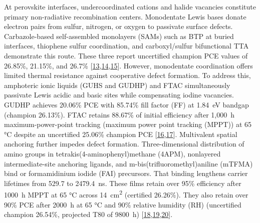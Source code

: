 \documentclass[
  11pt,
]{article}
\begin{document}
At perovskite interfaces, undercoordinated  cations and halide
vacancies constitute primary non-radiative recombination centers.
Monodentate Lewis bases donate electron pairs from sulfur, nitrogen, or
oxygen to passivate surface  defects. Carbazole-based
self-assembled monolayers (SAMs) such as BTP at buried interfaces,
thiophene sulfur coordination, and carboxyl/sulfur bifunctional TTA
demonstrate this route. These three report uncertified champion PCE
values of 26.85\%, 21.15\%, and 26.7\%
{[}\href{https://doi.org/10.1002/anie.1864800}{13},\href{https://doi.org/10.1021/acsami.6c05331}{14},\href{https://doi.org/10.1002/adma.73950}{15}{]}.
However, monodentate coordination offers limited thermal resistance
against cooperative defect formation. To address this, amphoteric ionic
liquids (GUHS and GUDHP) and FTAC simultaneously passivate Lewis acidic
and basic sites while compensating iodine vacancies. GUDHP achieves
20.06\% PCE with 85.74\% fill factor (FF) at \qty{1.84}{\electronvolt}
bandgap (champion 26.13\%). FTAC retains 88.67\% of initial efficiency
after 1,\qty{000}{\hour} maximum-power-point tracking (maximum power
point tracking (MPPT)) at 65 °C despite an uncertified 25.06\% champion
PCE
{[}\href{https://doi.org/10.1002/adfm.77378}{16},\href{https://doi.org/10.20517/energymater.2026.102}{17}{]}.
Multivalent spatial anchoring further impedes defect formation.
Three-dimensional distribution of amino groups in
tetrakis(4-aminophenyl)methane (4APM), nonlayered intermediate-site
anchoring ligands, and m-bis(trifluoromethyl)aniline (mTFMA) bind
 or formamidinium iodide (FAI) precursors. That binding
lengthens carrier lifetimes from 529.7 to \qty{2479.4}{\nano\second}.
These films retain over 95\% efficiency after \qty{1000}{\hour} MPPT at
65 °C across \qty{14}{\centi\meter\squared} (certified 26.26\%). They
also retain over 90\% PCE after \qty{2000}{\hour} at 65 °C and 90\%
relative humidity (RH) (uncertified champion 26.54\%, projected T80 of
\qty{9800}{\hour})
{[}\href{https://doi.org/10.1038/s41467-026-75990-x}{18},\href{https://doi.org/10.1002/adma.74243}{19},\href{https://doi.org/10.1021/acsaem.6c01560}{20}{]}.
\end{document}
